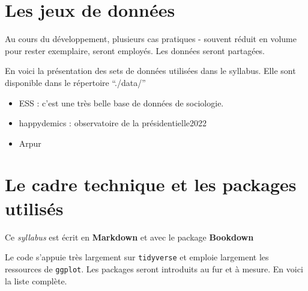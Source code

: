\documentclass[
]{book}
\providecommand{\tightlist}{%
  \setlength{\itemsep}{0pt}\setlength{\parskip}{0pt}}
\begin{document}
\hypertarget{les-jeux-de-donnuxe9es}{%
\section{Les jeux de données}\label{les-jeux-de-donnuxe9es}}

Au cours du développement, plusieurs cas pratiques - souvent réduit en volume pour rester exemplaire, seront employés. Les données seront partagées.

En voici la présentation des sets de données utilisées dans le syllabus. Elle sont disponible dans le répertoire ``./data/''

\begin{itemize}
\tightlist
\item
  ESS : c'est une très belle base de données de sociologie.
\item
  happydemics : observatoire de la présidentielle2022
\item
  Arpur
\end{itemize}

\hypertarget{le-cadre-technique-et-les-packages-utilisuxe9s}{%
\section{Le cadre technique et les packages utilisés}\label{le-cadre-technique-et-les-packages-utilisuxe9s}}

Ce \emph{syllabus} est écrit en \textbf{Markdown} \citep{allaire_rmarkdown_2021} et avec le package \textbf{Bookdown} \citep{R-bookdown}

Le code s'appuie très largement sur \texttt{tidyverse} et emploie largement les ressources de \texttt{ggplot}. Les packages seront introduits au fur et à mesure. En voici la liste complète.
\end{document}
